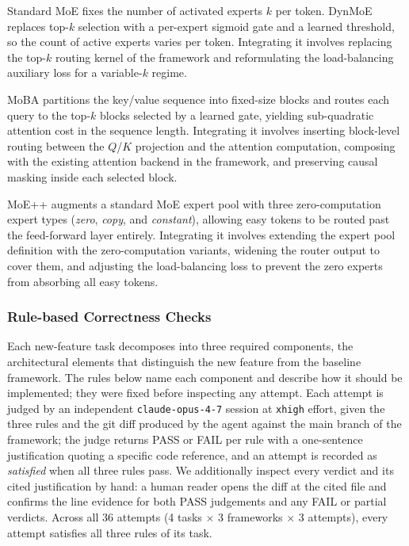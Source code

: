 Standard MoE fixes the number of activated experts $k$ per token.
DynMoE replaces top-$k$ selection with a per-expert sigmoid gate and
a learned threshold, so the count of active experts varies per
token. Integrating it involves replacing the top-$k$ routing
kernel of the framework and reformulating the load-balancing
auxiliary loss for a variable-$k$ regime.

MoBA partitions the key/value sequence into fixed-size blocks
and routes each query to the top-$k$ blocks
selected by a learned gate, yielding sub-quadratic attention
cost in the sequence length. Integrating it involves
inserting block-level routing between the $Q$/$K$ projection and
the attention computation, composing with the existing attention
backend in the framework, and preserving
causal masking inside each selected block.

MoE++ augments a standard MoE expert pool with three
zero-computation expert types (\emph{zero}, \emph{copy}, and
\emph{constant}), allowing easy tokens to be routed past the
feed-forward layer entirely. Integrating it involves extending the
expert pool definition with the zero-computation variants, widening
the router output to cover them, and adjusting the load-balancing
loss to prevent the zero experts from absorbing all easy tokens.

\subsubsection{Rule-based Correctness Checks}
\label{sec:appendix:tasks:rules}

Each new-feature task decomposes into three required components,
the architectural elements that distinguish the new feature from
the baseline framework. The rules below name each component and
describe how it should be implemented; they were fixed before
inspecting any attempt. Each
attempt is judged by an independent
\texttt{claude-opus-4-7} session at \texttt{xhigh} effort, given
the three rules and the git diff produced by the agent against the
main branch of the framework; the judge returns PASS or FAIL per
rule with a one-sentence justification quoting a specific code
reference, and an attempt is recorded as \emph{satisfied} when all
three rules pass. We additionally inspect every verdict and its
cited justification by hand: a human reader opens the diff at the
cited file and confirms the line evidence for both PASS judgements
and any FAIL or partial verdicts. Across all 36 attempts
(4 tasks $\times$ 3 frameworks $\times$ 3 attempts), every attempt
satisfies all three rules of its task.

